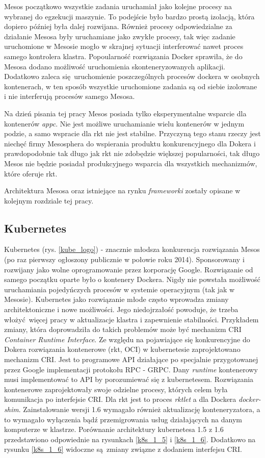 \documentclass[10pt,a4paper,titlepage,twoside]{report}
\begin{document}
Mesos początkowo wszystkie zadania uruchamiał jako kolejne procesy na wybranej do egzekucji maszynie. To podejście było bardzo prostą izolacją, która dopiero później była dalej rozwijana. Również procesy odpowiedzialne za działanie Mesosa były uruchamiane jako zwykłe procesy, tak więc zadanie uruchomione w Mesosie mogło w skrajnej sytuacji interferować nawet proces samego kontrolera klastra. Popoularność rozwiązania Docker sprawiła, że do Mesosa dodano możliwość uruchomienia skonteneryzowanych aplikacji. Dodatkowo zaleca się uruchomienie poszczególnych procesów dockera w osobnych kontenerach, w ten sposób wszystkie uruchomione zadania są od siebie izolowane i nie interferują procesów samego Mesosa.

Na dzień pisania tej pracy Mesos posiada tylko eksperymentalne wsparcie dla kontenerów \textit{appc}. Nie jest możliwe uruchamianie wielu kontenerów w jednym podzie, a samo wspracie dla rkt nie jest stabilne. Przyczyną tego stanu rzeczy jest niechęć firmy Mesosphera do wspierania produktu konkurencyjnego dla Dokera i prawdopodobnie tak długo jak rkt nie zdobędzie większej popularności, tak długo Mesos nie będzie posiadał produkcyjnego wsparcia dla wszystkich mechanizmów, które oferuje rkt.

Architektura Mesosa oraz istniejące na rynku \textit{frameworki} zostały opisane w kolejnym rozdziale tej pracy. 

\subsection{Kubernetes}

Kubernetes (rys. \ref{kube_logo}) - znacznie młodsza konkurencja rozwiązania Mesos (po raz pierwszy ogłoszony publicznie w połowie roku 2014). Sponsorowany i rozwijany jako wolne oprogramowanie przez korporację Google. Rozwiązanie od samego początku oparte było o kontenery Dockera. Nigdy nie powstała możliwość uruchamiania pojedyńczych procesów w systemie operacyjnym (tak jak w Mesosie). Kubernetes jako rozwiązanie młode często wprowadza zmiany architektoniczne i nowe możliwości. Jego niedojrzałość powoduje, że trzeba włożyć więcej pracy w aktualizacje klastra i zapewnienie stabilności. Przykładem zmiany, która doprowadziła do takich problemów może być mechanizm CRI \textit{Container Runtime Interface}. Ze względu na pojawiające się konkurencyjne do Dokera rozwiązania kontenerowe (rkt, OCI) w kubernetesie zaprojektowano mechanizm CRI. Jest to programowe API działające po specjalnie przygotowanej przez Google implementacji protokołu RPC - GRPC. Dany \textit{runtime} kontenerowy musi implementować to API by porozumiewać się z kubernetesem. Rozwiązania kontenerowe zaprojektowały swoje odzielne procesy, których celem była komunikacja po interfejsie CRI. Dla rkt jest to proces \textit{rktlet} a dla Dockera \textit{docker-shim}. Zainstalowanie wersji 1.6 wymagało również aktualizację konteneryzatora, a to wymagało wyłączenia bądź przemigrowania usług działających na danym komputerze w klastrze. Porównanie architektury kubernetesa 1.5 z 1.6 przedstawiono odpowiednie na rysunkach \ref{k8s_1_5} i \ref{k8s_1_6}. Dodatkowo na rysunku \ref{k8s_1_6} widoczne są zmiany związne z dodaniem interfejsu CRI.
\end{document}
